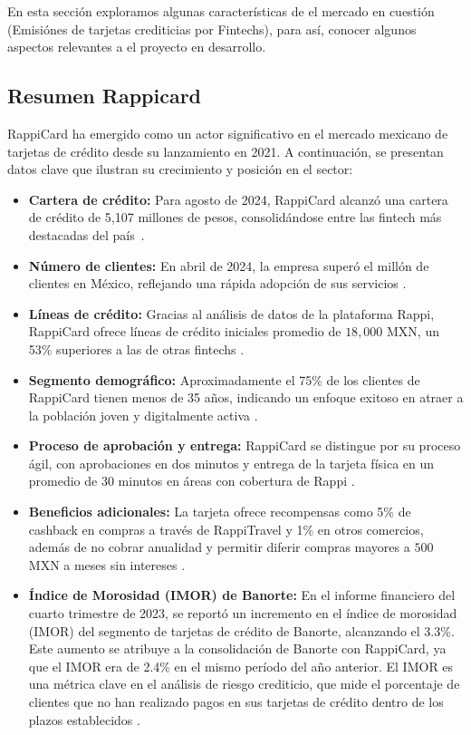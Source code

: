 En esta sección exploramos algunas características de el mercado en cuestión (Emisiónes de tarjetas crediticias por Fintechs), para así, conocer algunos aspectos relevantes a el proyecto en desarrollo.

\subsection*{Resumen Rappicard}
RappiCard ha emergido como un actor significativo en el mercado mexicano de tarjetas de crédito desde su lanzamiento en 2021. A continuación, se presentan datos clave que ilustran su crecimiento y posición en el sector:

\begin{itemize}
    \item \textbf{Cartera de crédito:} Para agosto de 2024, RappiCard alcanzó una cartera de crédito de 5,107 millones de pesos, consolidándose entre las fintech más destacadas del país~\cite{forbes_cartera_2024}.
    \item \textbf{Número de clientes:} En abril de 2024, la empresa superó el millón de clientes en México, reflejando una rápida adopción de sus servicios \cite{expansion_millon_2024}.
    \item \textbf{Líneas de crédito:} Gracias al análisis de datos de la plataforma Rappi, RappiCard ofrece líneas de crédito iniciales promedio de $18,000$ MXN, un 53\% superiores a las de otras fintechs \cite{chocale_millon_2024}.
    \item \textbf{Segmento demográfico:} Aproximadamente el 75\% de los clientes de RappiCard tienen menos de 35 años, indicando un enfoque exitoso en atraer a la población joven y digitalmente activa \cite{expansion_millon_2024}.
    \item \textbf{Proceso de aprobación y entrega:} RappiCard se distingue por su proceso ágil, con aprobaciones en dos minutos y entrega de la tarjeta física en un promedio de 30 minutos en áreas con cobertura de Rappi \cite{forbes_cartera_2024}.
    \item \textbf{Beneficios adicionales:} La tarjeta ofrece recompensas como 5\% de cashback en compras a través de RappiTravel y 1\% en otros comercios, además de no cobrar anualidad y permitir diferir compras mayores a $500$ MXN a meses sin intereses \cite{chocale_millon_2024}.
    \item \textbf{Índice de Morosidad (IMOR) de Banorte:} En el informe financiero del cuarto trimestre de 2023, se reportó un incremento en el índice de morosidad (IMOR) del segmento de tarjetas de crédito de Banorte, alcanzando el 3.3\%. Este aumento se atribuye a la consolidación de Banorte con RappiCard, ya que el IMOR era de 2.4\% en el mismo período del año anterior. El IMOR es una métrica clave en el análisis de riesgo crediticio, que mide el porcentaje de clientes que no han realizado pagos en sus tarjetas de crédito dentro de los plazos establecidos \cite{fintechexpertrappicardmorosidad}.

\end{itemize}
